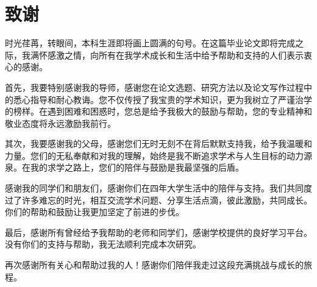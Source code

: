 \section*{致谢}

时光荏苒，转眼间，本科生涯即将画上圆满的句号。在这篇毕业论文即将完成之际，我满怀感激之情，向所有在我学术成长和生活中给予帮助和支持的人们表示衷心的感谢。

首先，我要特别感谢我的导师，感谢您在论文选题、研究方法以及论文写作过程中的悉心指导和耐心教诲。您不仅传授了我宝贵的学术知识，更为我树立了严谨治学的榜样。在遇到困难和困惑时，您总是给予我极大的鼓励与帮助，您的专业精神和敬业态度将永远激励我前行。

其次，我要感谢我的父母，感谢您们无时无刻不在背后默默支持我，给予我温暖和力量。您们的无私奉献和对我的理解，始终是我不断追求学术与人生目标的动力源泉。在我的求学之路上，您们的陪伴与鼓励是我最坚强的后盾。

感谢我的同学们和朋友们，感谢你们在四年大学生活中的陪伴与支持。我们共同度过了许多难忘的时光，相互交流学术问题、分享生活点滴，彼此激励，共同成长。你们的帮助和鼓励让我更加坚定了前进的步伐。

最后，感谢所有曾经给予我帮助的老师和同学们，感谢学校提供的良好学习平台。没有你们的支持与帮助，我无法顺利完成本次研究。

再次感谢所有关心和帮助过我的人！感谢你们陪伴我走过这段充满挑战与成长的旅程。